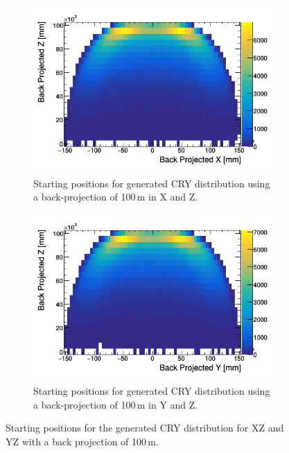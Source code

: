 \begin{figure}[!h]
\centering
\begin{subfigure}{.5\textwidth}
  \centering
  \includegraphics[width=\linewidth]{Chapter4/Figs/Raster/CryPlots/BackProjectionXZ.png}
  \captionsetup{width=.9\linewidth}
  \caption{Starting positions for generated CRY distribution using a back-projection of 100\,m in X and Z.}
  \label{subFig:BackProjectionXZ}
\end{subfigure}%
\begin{subfigure}{.5\textwidth}
  \centering
  \includegraphics[width=\linewidth]{Chapter4/Figs/Raster/CryPlots/BackProjectionYZ.png}
  \captionsetup{width=.9\linewidth}
  \caption{Starting positions for generated CRY distribution using a back-projection of 100\,m in Y and Z.}
  \label{subFig:BackProjectionYZ}
\end{subfigure}
\caption{Starting positions for the generated CRY distribution for XZ and YZ with a back projection of 100\,m.}
\label{fig:BackProjection_XZ_YZ}
\end{figure}

